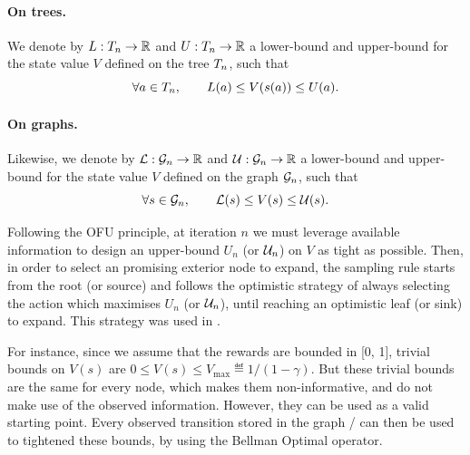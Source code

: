 \documentclass[runningheads]{llncs}
\begin{document}
\begin{definition}
\paragraph{\textbf{On trees.}} We denote by $L:T_n \rightarrow \mathbb{R}$ and  $U:T_n \rightarrow \mathbb{R}$ a lower-bound and upper-bound for the state value $V$ defined on the tree $T_n$, such that
\begin{equation*}
    \forall a\in T_n, \qquad L(a) \leq V(s(a)) \leq U(a).
\end{equation*}

\paragraph{\textbf{On graphs.}} Likewise, we denote by $\mathcal{L}:\mathcal{G}_n \rightarrow \mathbb{R}$ and  $\mathcal{U}:\mathcal{G}_n \rightarrow \mathbb{R}$ a lower-bound and upper-bound for the state value $V$ defined on the graph $\mathcal{G}_n$, such that
\begin{equation*}
\forall s\in\mathcal{G}_n, \qquad \mathcal{L}(s) \leq V(s) \leq \mathcal{U}(s).
\end{equation*}
\end{definition}

Following the OFU principle, at iteration $n$ we must leverage available information to design an upper-bound $U_n$ (or $\mathcal{U}_n$) on $V$ as tight as possible. Then, in order to select an promising exterior node to expand, the sampling rule starts from the root (or source) and follows the optimistic strategy of always selecting the action which maximises $U_n$ (or $\mathcal{U}_n$), until reaching an optimistic leaf (or sink) to expand. This strategy was used in \citep[e.g.][]{Kocsis06UCT, hren2008optimistic, bubeck2010open, busoniu2012optimistic}.

For instance, since we assume that the rewards are bounded in [0, 1], trivial bounds on $V(s)$ are
$0 \leq V(s) \leq V_{\max} \eqdef {1}/({1-\gamma})$. But these trivial bounds are the same for every node, which makes them non-informative, and do not make use of the observed information. However, they can be used as a valid starting point. Every observed transition stored in the graph / can then be used to tightened these bounds, by using the Bellman Optimal operator.
\end{document}

